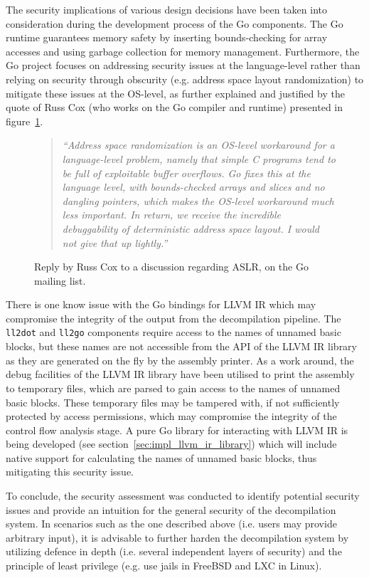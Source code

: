 The security implications of various design decisions have been taken into consideration during the development process of the Go components. The Go runtime guarantees memory safety by inserting bounds-checking for array accesses and using garbage collection for memory management. Furthermore, the Go project focuses on addressing security issues at the language-level rather than relying on security through obscurity (e.g. address space layout randomization) to mitigate these issues at the OS-level, as further explained and justified by the quote of Russ Cox (who works on the Go compiler and runtime) presented in figure~\ref{fig:no_aslr}.

\begin{figure}[htbp]
	\begin{quote}
		\textit{``Address space randomization is an OS-level workaround for a language-level problem, namely that simple C programs tend to be full of exploitable buffer overflows. Go fixes this at the language level, with bounds-checked arrays and slices and no dangling pointers, which makes the OS-level workaround much less important. In return, we receive the incredible debuggability of deterministic address space layout. I would not give that up lightly.''}
	\end{quote}
	\caption{Reply by Russ Cox to a discussion regarding ASLR, on the Go mailing list\protect\footnotemark.}
	\label{fig:no_aslr}
\end{figure}

There is one know issue with the Go bindings for LLVM IR which may compromise the integrity of the output from the decompilation pipeline. The \texttt{ll2dot} and \texttt{ll2go} components require access to the names of unnamed basic blocks, but these names are not accessible from the API of the LLVM IR library as they are generated on the fly by the assembly printer. As a work around, the debug facilities of the LLVM IR library have been utilised to print the assembly to temporary files, which are parsed to gain access to the names of unnamed basic blocks. These temporary files may be tampered with, if not sufficiently protected by access permissions, which may compromise the integrity of the control flow analysis stage. A pure Go library for interacting with LLVM IR is being developed (see section~\ref{sec:impl_llvm_ir_library}) which will include native support for calculating the names of unnamed basic blocks, thus mitigating this security issue.

To conclude, the security assessment was conducted to identify potential security issues and provide an intuition for the general security of the decompilation system. In scenarios such as the one described above (i.e. users may provide arbitrary input), it is advisable to further harden the decompilation system by utilizing defence in depth (i.e. several independent layers of security) and the principle of least privilege (e.g. use jails in FreeBSD and LXC in Linux).
